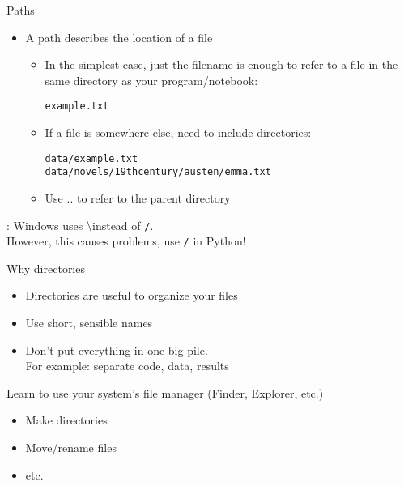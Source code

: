 \documentclass[aspectratio=169,usenames,dvipsnames]{beamer}
\begin{document}
\begin{frame}{Paths}
    \begin{itemize}
        \item A path describes the location of a file
		\begin{itemize}
        \item In the simplest case, just the filename is enough to
            refer to a file in the same directory as your program/notebook:

            \texttt{example.txt}

        \item If a file is somewhere else, need to include directories:

            \texttt{data/example.txt}\\
            \texttt{data/novels/19thcentury/austen/emma.txt}
		\item Use .. to refer to the parent directory
		\end{itemize}
    \end{itemize}
    : Windows uses \textbackslash instead of \texttt{/}. \\
        However, this causes problems, use \texttt{/} in Python!
\end{frame}

\begin{frame}{Why directories}
    \begin{itemize}
        \item Directories are useful to organize your files
        \item Use short, sensible names
        \item Don't put everything in one big pile. \\
            For example: separate code, data, results
    \end{itemize}
    \pause 
    Learn to use your system's file manager (Finder, Explorer, etc.)
    \begin{itemize}
        \item Make directories
        \item Move/rename files
        \item etc.
    \end{itemize}
    
\end{frame}
\end{document}

